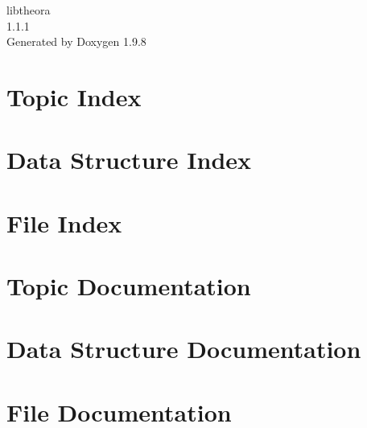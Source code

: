 \documentclass[twoside]{book}
\newcommand{\+}{\discretionary{\mbox{\scriptsize$\hookleftarrow$}}{}{}}
\newcommand{\clearemptydoublepage}{%
    \newpage{\pagestyle{empty}\cleardoublepage}%
  }
\begin{document}
  \raggedbottom
  \begin{titlepage}
  \vspace*{7cm}
  \begin{center}%
  {\Large libtheora}\\
  [1ex]\large 1.\+1.\+1 \\
  \vspace*{1cm}
  {\large Generated by Doxygen 1.9.8}\\
  \end{center}
  \end{titlepage}
  \clearemptydoublepage
  \tableofcontents
  \clearemptydoublepage

\chapter{Topic Index}

\chapter{Data Structure Index}

\chapter{File Index}

\chapter{Topic Documentation}




\chapter{Data Structure Documentation}











\chapter{File Documentation}








  \backmatter
  \newpage
  \clearemptydoublepage
  \printindex
\end{document}
